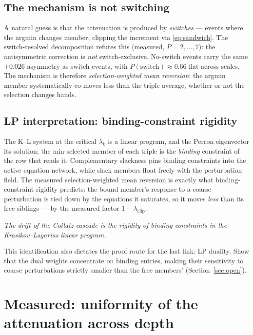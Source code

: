 \documentclass[11pt]{article}
\theoremstyle{definition}
\theoremstyle{remark}
\newcommand{\lam}{\lambda}
\begin{document}
\subsection{The mechanism is not switching}

A natural guess is that the attenuation is produced by \emph{switches} ---
events where the argmin changes member, clipping the increment via
\eqref{eq:sandwich}. The switch-resolved decomposition refutes this
(measured, $P = 2, \ldots, 7$): the antisymmetric correction is \emph{not}
switch-exclusive. No-switch events carry the same $\pm 0.026$ asymmetry as
switch events, with $P(\mathrm{switch}) \approx 0.66$ flat across scales.
The mechanism is therefore \emph{selection-weighted mean reversion}: the
argmin member systematically co-moves less than the triple average,
whether or not the selection changes hands.

\subsection{LP interpretation: binding-constraint rigidity}

The K--L system at the critical $\lam_k$ is a linear program, and the
Perron eigenvector its solution; the min-selected member of each triple
is the \emph{binding} constraint of the row that reads it. Complementary
slackness pins binding constraints into the active equation network, while
slack members float freely with the perturbation field. The measured
selection-weighted mean reversion is exactly what binding-constraint
rigidity predicts: the bound member's response to a coarse perturbation is
tied down by the equations it saturates, so it moves \emph{less} than its
free siblings --- by the measured factor $1 - \lam_{\mathrm{clip}}$.

\begin{center}
\emph{The drift of the Collatz cascade is the rigidity of binding
constraints in the Krasikov--Lagarias linear program.}
\end{center}

This identification also dictates the proof route for the last link:
LP duality. Show that the dual weights concentrate on binding entries,
making their sensitivity to coarse perturbations strictly smaller than the
free members' (Section~\ref{sec:open}).

\section{Measured: uniformity of the attenuation across depth}
\label{sec:uniform}
\end{document}
